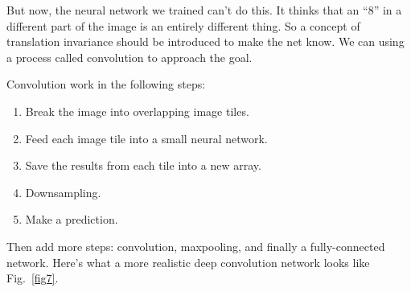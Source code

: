 \documentclass[10pt,twocolumn,letterpaper]{article}
\begin{document}
	\par
	But now, the neural network we trained can't do this. It thinks that an ``8'' in a different part of the image is an entirely different thing. So a concept of translation invariance should be introduced to make the net know. We can using a process called convolution to approach the goal.
	\par
	Convolution work in the following steps:
	\begin{enumerate}
		\item Break the image into overlapping image tiles.
		\item  Feed each image tile into a small neural network.
		\item Save the results from each tile into a new array.
		\item Downsampling.
		\item Make a prediction.
	\end{enumerate}
	\par
	Then add more steps: convolution, maxpooling, and finally a fully-connected network. Here's what a more realistic deep convolution network looks like Fig.~\ref{fig7}.
{\small
	
	
}
\end{document}
